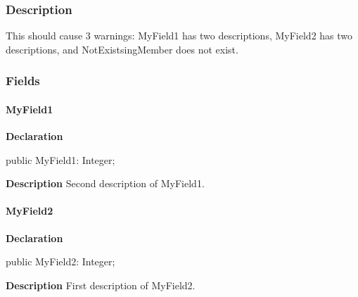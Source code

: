 \documentclass{report}
\begin{document}
\subsubsection*{\large{\textbf{Description}}\normalsize\hspace{1ex}\hfill}


 



This should cause 3 warnings: MyField1 has two descriptions, MyField2 has two descriptions, and NotExistsingMember does not exist.\subsubsection*{\large{\textbf{Fields}}\normalsize\hspace{1ex}\hfill}
\paragraph*{MyField1}\hspace*{\fill}

\begin{list}{}{
\setlength{\itemindent}{0cm}
\setlength{\listparindent}{0cm}
\setlength{\leftmargin}{\evensidemargin}
\addtolength{\leftmargin}{\tmplength}
\settowidth{\labelsep}{X}
\addtolength{\leftmargin}{\labelsep}
\setlength{\labelwidth}{\tmplength}
}
\begin{flushleft}
\item[\textbf{Declaration}\hfill]
\begin{ttfamily}
public MyField1: Integer;\end{ttfamily}


\end{flushleft}
\par
\item[\textbf{Description}]
Second description of MyField1.

\end{list}
\paragraph*{MyField2}\hspace*{\fill}

\begin{list}{}{
\setlength{\itemindent}{0cm}
\setlength{\listparindent}{0cm}
\setlength{\leftmargin}{\evensidemargin}
\addtolength{\leftmargin}{\tmplength}
\settowidth{\labelsep}{X}
\addtolength{\leftmargin}{\labelsep}
\setlength{\labelwidth}{\tmplength}
}
\begin{flushleft}
\item[\textbf{Declaration}\hfill]
\begin{ttfamily}
public MyField2: Integer;\end{ttfamily}


\end{flushleft}
\par
\item[\textbf{Description}]
First description of MyField2.

\end{list}
\end{document}
